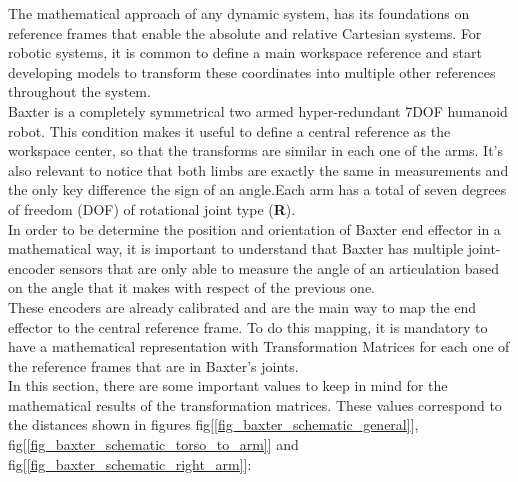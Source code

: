 \documentclass[11pt]{report} %
\begin{document}
The mathematical approach of any dynamic system, has its foundations on reference frames that enable the absolute and relative Cartesian systems. For robotic systems, it is common to define a main workspace reference and start developing models to transform these coordinates into multiple other references throughout the system.\\

Baxter is a completely symmetrical two armed hyper-redundant 7DOF humanoid robot. This condition makes it useful to define a central reference as the workspace center, so that the transforms are similar in each one of the arms. It's also relevant to notice that both limbs are exactly the same in measurements and the only key difference the sign of an angle.Each arm has a total of seven degrees of freedom (DOF) of rotational joint type (\textbf{R}).\\

In order to be determine the position and orientation of Baxter end effector in a mathematical way, it is important to understand that Baxter has multiple joint-encoder sensors that are only able to measure the angle of an articulation based on the angle that it makes with respect of the previous one.\\

These encoders are already calibrated and are the main way to map the end effector to the central reference frame. To do this mapping, it is mandatory to have a mathematical representation with Transformation Matrices for each one of the reference frames that are in Baxter's joints.\\

In this section, there are some important values to keep in mind for the mathematical results of the transformation matrices. These values correspond to the distances shown in figures fig[\ref{fig_baxter_schematic_general}], fig[\ref{fig_baxter_schematic_torso_to_arm}] and fig[\ref{fig_baxter_schematic_right_arm}]:
\end{document}
